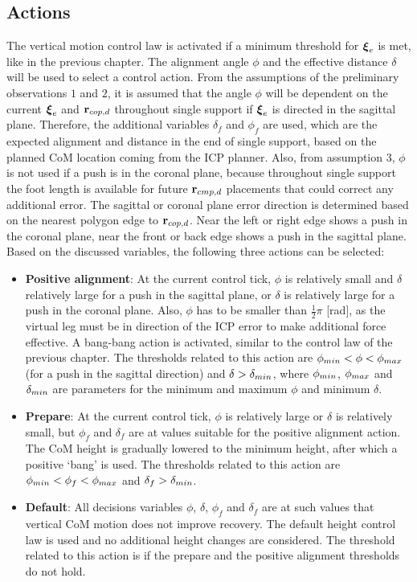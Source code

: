 \subsection{Actions}
The vertical motion control law is activated if a minimum threshold for $\boldsymbol{\xi}_e$ is met, like in the previous chapter. The alignment angle $\phi$ and the effective distance $\delta$ will be used to select a control action. From the assumptions of the preliminary observations $1$ and $2$, it is assumed that the angle $\phi$ will be dependent on the current $\boldsymbol{\xi}_e$ and $\mathbf{r}_{cop,d}$ throughout single support if $\boldsymbol{\xi}_e$ is directed in the sagittal plane. Therefore, the additional variables $\delta_f$ and $\phi_f$ are used, which are the expected alignment and distance in the end of single support, based on the planned \ac{CoM} location coming from the \ac{ICP} planner. Also, from assumption $3$, $\phi$ is not used if a push is in the coronal plane, because throughout single support the foot length is available for future $\mathbf{r}_{cmp,d}$ placements that could correct any additional error. The sagittal or coronal plane error direction is determined based on the nearest polygon edge to $\mathbf{r}_{cop,d}$. Near the left or right edge shows a push in the coronal plane, near the front or back edge shows a push in the sagittal plane. Based on the discussed variables, the following three actions can be selected:
\begin{itemize}
	\item \textbf{Positive alignment}: At the current control tick, $\phi$ is relatively small and $\delta$ relatively large for a push in the sagittal plane, or $\delta$ is relatively large for a push in the coronal plane. Also, $\phi$ has to be smaller than $\frac{1}{2}\pi$ [rad], as the virtual leg must be in direction of the \ac{ICP} error to make additional force effective. A bang-bang action is activated, similar to the control law of the previous chapter. The thresholds related to this action are $\phi_{min} < \phi < \phi_{max}$ (for a push in the sagittal direction) and $\delta > \delta_{min}$, where $\phi_{min}$, $\phi_{max}$ and $\delta_{min}$ are parameters for the minimum and maximum $\phi$ and minimum $\delta$.
	\item \textbf{Prepare}: At the current control tick, $\phi$ is relatively large or $\delta$ is relatively small, but $\phi_f$ and $\delta_f$ are at values suitable for the positive alignment action. The \ac{CoM} height is gradually lowered to the minimum height, after which a positive `bang' is used. The thresholds related to this action are $\phi_{min}<\phi_f<\phi_{max}$ and $\delta_f>\delta_{min}$.
	\item \textbf{Default}: All decisions variables $\phi$, $\delta$, $\phi_f$ and $\delta_f$ are at such values that vertical \ac{CoM} motion does not improve recovery. The default height control law is used and no additional height changes are considered. The threshold related to this action is if the prepare and the positive alignment thresholds do not hold.
\end{itemize}

